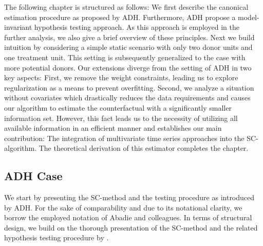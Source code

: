 The following chapter is structured as follows: We first describe the canonical estimation procedure as proposed by \ac{ADH}. Furthermore, \ac{ADH} propose a model-invariant hypothesis testing approach. As this approach is employed in the further analysis, we also give a brief overview of these principles. Next we build intuition by considering a simple static scenario with only two donor units and one treatment unit. This setting is subsequently generalized to the case with more potential donors. Our extensions diverge from the setting of \ac{ADH} in two key aspects: First, we remove the weight constraints, leading us to explore regularization as a means to prevent overfitting. Second, we analyze a situation without covariates which drastically reduces the data requirements and causes our algorithm to estimate the counterfactual with a significantly smaller information set. However, this fact leads us to the necessity of utilizing all available information in an efficient manner and establishes our main contribution: The integration of  multivariate time series approaches into the \ac{SC}-algorithm. The theoretical derivation of this estimator completes the chapter.

\subsection{ADH Case}
We start by presenting the \ac{SC}-method and the testing procedure as introduced by \ac{ADH}. For the sake of comparability and due to its notational clarity, we borrow the employed notation of Abadie and colleagues. In terms of structural design, we build on the thorough presentation of the \ac{SC}-method and the related hypothesis testing procedure by \cite{firpo:2018}.


